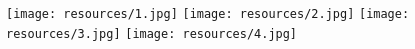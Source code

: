 
\begin{center}
    \texttt{[image: resources/1.jpg]}
    \texttt{[image: resources/2.jpg]}
    \texttt{[image: resources/3.jpg]}
    \texttt{[image: resources/4.jpg]}
\end{center}
